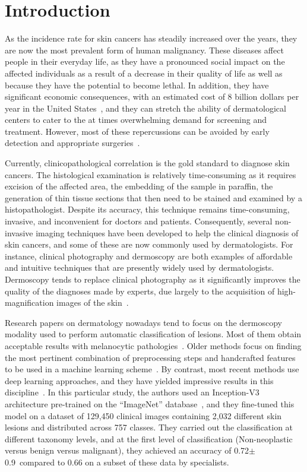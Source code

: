 \documentclass[journal,article,accept,moreauthors,pdftex, applsci]{Definitions/mdpi}
\begin{document}

\section{Introduction}
As the incidence rate for skin cancers has steadily increased over the years, they are now the most prevalent form of human malignancy. These diseases affect people in their everyday life, as they have a pronounced social impact on the affected individuals as a result of a decrease in their quality of life as well as because they have the potential to become lethal. In addition, they have significant economic consequences, with an estimated cost of 8 billion dollars per year in the United States~\cite{Farberg2017a}, and they can stretch the ability of dermatological centers to cater to the at times overwhelming demand for screening and treatment. However, most of these repercussions can be avoided by early detection and appropriate surgeries~\cite{Farberg2017a}.\par
Currently, clinicopathological correlation is the gold standard to diagnose skin cancers. The histological examination is relatively time-consuming as it requires excision of the affected area, the embedding of the sample in paraffin, the generation of thin tissue sections that then need to be stained and examined by a histopathologist. Despite its accuracy, this technique remains time-consuming, invasive, and inconvenient for doctors and patients. Consequently, several non-invasive imaging techniques have been developed to help the clinical diagnosis of skin cancers, and some of these are now commonly used by dermatologists. For instance, clinical photography and dermoscopy are both examples of affordable and intuitive techniques that are presently widely used by dermatologists. Dermoscopy tends to replace clinical photography as it significantly improves the quality of the diagnoses made by experts, due largely to the acquisition of high-magnification images of the skin~\cite{Sinz2017}.\par
Research papers on dermatology nowadays tend to focus on the dermoscopy modality used to perform automatic classification of lesions. Most of them obtain acceptable results with melanocytic pathologies~\cite{Iyatomi2010}. Older methods focus on finding the most pertinent combination of preprocessing steps and handcrafted features to be used in a machine learning scheme~\cite{Rastgoo2015,Pathan2018}. By contrast, most recent methods use deep learning approaches, and they have yielded impressive results in this discipline~\cite{Esteva2017}. In this particular study, the authors used an Inception-V3 architecture pre-trained on the “ImageNet” database~\cite{Deng2008}, and they fine-tuned this model on a dataset of 129,450 clinical images containing 2,032 different skin lesions and distributed across 757 classes. They carried out the classification at different taxonomy levels, and at the first level of classification (Non-neoplastic versus benign versus malignant), they achieved an accuracy of 0.72$\pm$0.9\ compared to 0.66 on a subset of these data by specialists.\par
\end{document}
